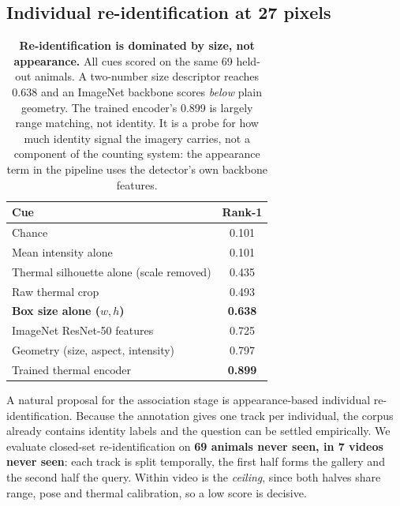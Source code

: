 \subsection{Individual re-identification at 27 pixels}
\label{sec:reid}

\begin{table}[t]
\centering\small
\begin{tabular}{lc}
\toprule
Cue & Rank-1 \\
\midrule
Chance & 0.101 \\
Mean intensity alone & 0.101 \\
Thermal silhouette alone (scale removed) & 0.435 \\
Raw thermal crop & 0.493 \\
\textbf{Box size alone ($w,h$)} & \textbf{0.638} \\
ImageNet ResNet-50 features & 0.725 \\
Geometry (size, aspect, intensity) & 0.797 \\
Trained thermal encoder & \textbf{0.899} \\
\bottomrule
\end{tabular}
\caption{\textbf{Re-identification is dominated by size, not appearance.} All cues scored on
the same 69 held-out animals. A two-number size descriptor reaches 0.638 and an ImageNet
backbone scores \emph{below} plain geometry. The trained encoder's 0.899 is largely range
matching, not identity. It is a probe for how much identity signal the imagery carries, not
a component of the counting system: the appearance term in the pipeline uses the detector's
own backbone features.}
\label{tab:reid}
\end{table}

A natural proposal for the association stage is appearance-based individual
re-identification. Because the annotation gives one track per individual, the corpus already
contains identity labels and the question can be settled empirically. We evaluate closed-set
re-identification on \textbf{69 animals never seen, in 7 videos never seen}: each track is
split temporally, the first half forms the gallery and the second half the query. Within
video is the \emph{ceiling}, since both halves share range, pose and thermal calibration, so
a low score is decisive.

